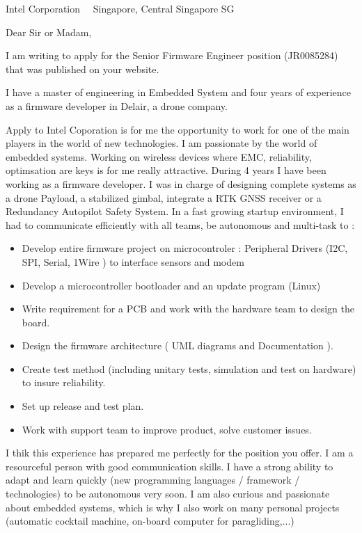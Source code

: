 \documentclass{scrlttr2}
\renewcommand{\\}{\ {\large\textperiodcentered}\ }
\begin{document}

\begin{letter}{ %
Intel Corporation\\
Singapore, Central Singapore SG
}


\opening{Dear Sir or Madam,}

I am writing to apply for the Senior Firmware Engineer position (JR0085284) that was published on your website.

I have a master of engineering in Embedded System and four years of experience
as a firmware developer in Delair, a drone company.
	
Apply to Intel Coporation is
for me the opportunity to work for one of the main players in the world of new technologies.
I am passionate by the world of embedded systems. Working on wireless devices where EMC, reliability, optimsation are keys is for me really attractive. 
During 4 years I have been working as a firmware developer. I was in charge of
designing complete systems as a drone Payload, a stabilized gimbal, integrate a RTK
GNSS receiver or a Redundancy Autopilot Safety System. In a fast growing startup environment, I had to
communicate efficiently with all teams, be autonomous and multi-task to : 
\begin{itemize}
\item Develop entire firmware project on microcontroler : Peripheral Drivers (I2C, SPI, Serial, 1Wire ) to interface sensors and modem
\item Develop a microcontroller bootloader and an update program (Linux)
\item Write requirement for a PCB and work with the hardware team to design the board.
\item Design the firmware architecture ( UML diagrams and Documentation ).
\item Create test method (including unitary tests, simulation and test on hardware) to insure reliability.
\item Set up release and test plan.
\item Work with support team to improve product, solve customer issues.
\end{itemize}
I thik this experience has prepared me perfectly for the position you offer. I am a resourceful person with good communication skills. I have a strong ability to adapt and learn quickly (new programming languages / framework / technologies) to be autonomous very soon.
I am also curious and passionate about embedded systems, which is why I also work on many personal projects (automatic cocktail machine, on-board computer for paragliding,...)


\end{letter}
\end{document}
